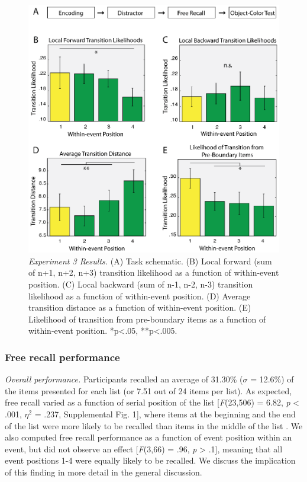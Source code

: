 \begin{figure}
  \centering
  \includegraphics[width=\textwidth]{figures/chapter1_figure4.eps}
  \caption[Behavioral experiment 3 results]{\textit{Experiment 3 Results.} (A) Task schematic. (B) Local forward (sum of n+1, n+2, n+3) transition likelihood as a function of within-event position. (C) Local backward (sum of n-1, n-2, n-3) transition likelihood as a function of within-event position. (D) Average transition distance as a function of within-event position.  (E) Likelihood of transition from pre-boundary items as a function of within-event position.  *p<.05, **p<.005.}
  \label{chapter1_figure4}
\end{figure}

\subsubsection{Free recall performance}\label{free-recall-performance}

\emph{Overall performance.} Participants recalled an average of 31.30\%
(\(\sigma\) = 12.6\%) of the items presented for each list (or 7.51 out
of 24 items per list). As expected, free recall varied as a function of
serial position of the list {[}\emph{F}(23,506) = 6.82, \emph{p}
\textless{} .001, \(\eta^{2}\) = .237, Supplemental Fig. 1{]}, where
items at the beginning and the end of the list were more likely to be
recalled than items in the middle of the list
\autocite{murdock_serial_1962}. We also computed free recall performance
as a function of event position within an event, but did not observe an
effect {[}\emph{F}(3,66) = .96, \emph{p} \textgreater{} .1{]}, meaning
that all event positions 1-4 were equally likely to be recalled. We
discuss the implication of this finding in more detail in the general
discussion.

